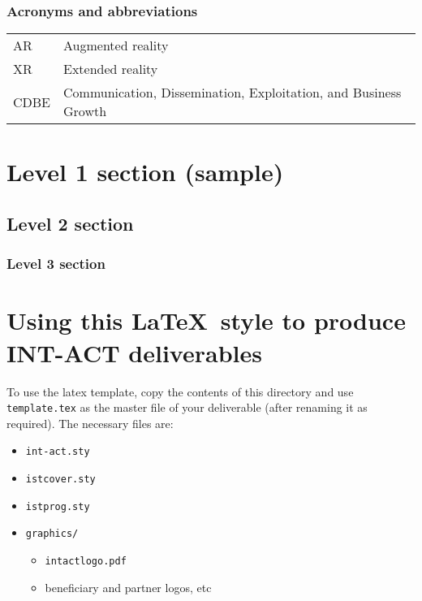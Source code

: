 \documentclass[10pt]{report}
\begin{document}
\newpage
\subsubsection*{Acronyms and abbreviations}\vspace{-1.5ex}

\def\arraystretch{1}
  \begin{tabular}[t]{!{\color{INT-ACTorange}\vrule}a!{\color{INT-ACTorange}\vrule}l!{\color{INT-ACTorange}\vrule}}
    \hline
    \color{white}
    AR &
    \color{black}
    Augmented reality
    \\\hhline{~-}
        \color{white}
    XR &
    \color{black}
    Extended reality
    \\\hhline{~-}
    \color{white}
    CDBE &
    \color{black}
    Communication, Dissemination, Exploitation, and Business Growth
    \\\hline
\end{tabular}

\newpage
\section{Level 1 section (sample)}


\lipsum[1]

\subsection{Level 2 section}

\lipsum[1]

\subsubsection{Level 3 section}

\lipsum[1]

\newpage
\section{Using this \LaTeX\ style to produce INT-ACT deliverables}

\newcommand{\macro}[1]{{\tt \textbackslash #1}}

To use the latex template, copy the contents of this directory and use
{\tt template.tex} as the master file of your deliverable (after
renaming it as required). The necessary files are:

\begin{itemize}[itemsep=-1ex]
\item \verb'int-act.sty'
\item \verb'istcover.sty'
\item \verb'istprog.sty'
\item \verb'graphics/'
  \begin{itemize}[itemsep=-1ex, topsep=-1ex]
  \item \verb'intactlogo.pdf'
  \item beneficiary and partner logos, etc
  \end{itemize}
\end{itemize}
\end{document}
